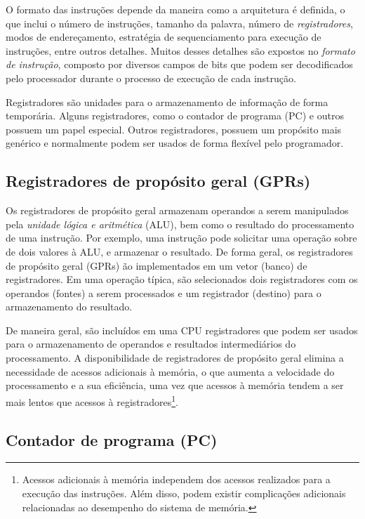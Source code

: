 \documentclass[11pt,a4paper]{report}
\begin{document}
O formato das instruções depende da maneira como a arquitetura é definida,
o que inclui o número de instruções, tamanho da palavra, número de
\textit{registradores}, modos de endereçamento, estratégia de
sequenciamento para execução de instruções, entre outros detalhes. Muitos
desses detalhes são expostos no \textit{formato de instrução}, composto
por diversos campos de bits que podem ser decodificados pelo processador
durante o processo de execução de cada instrução.

Registradores são unidades para o armazenamento de informação de forma
temporária. Alguns registradores, como o contador de programa (PC) e
outros possuem um papel especial. Outros registradores, possuem um
propósito mais genérico e normalmente podem ser usados de forma flexível
pelo programador.

\subsection{Registradores de propósito geral (GPRs)}

Os registradores de propósito geral armazenam operandos a serem manipulados
pela \textit{unidade lógica e aritmética} (ALU), bem como o resultado
do processamento de uma instrução. Por exemplo, uma instrução pode
solicitar uma operação sobre de dois valores à ALU, e armazenar o
resultado. De forma geral, os registradores de propósito geral (GPRs)
ão implementados em um vetor (banco) de registradores. Em uma operação
típica, são selecionados dois registradores com os operandos (fontes) a
serem processados e um registrador (destino) para o armazenamento do
resultado.

De maneira geral, são incluídos em uma CPU registradores que podem ser
usados para o armazenamento de operandos e resultados intermediários
do processamento. A disponibilidade de registradores de propósito geral
elimina a necessidade de acessos adicionais à memória, o que aumenta
a velocidade do processamento e a sua eficiência, uma vez que acessos
à memória tendem a ser mais lentos que acessos à registradores\footnote{
Acessos adicionais à memória independem dos acessos realizados para a
execução das instruções. Além disso, podem existir complicações
adicionais relacionadas ao desempenho do sistema de memória.}.

\subsection{Contador de programa (PC)}
\end{document}
